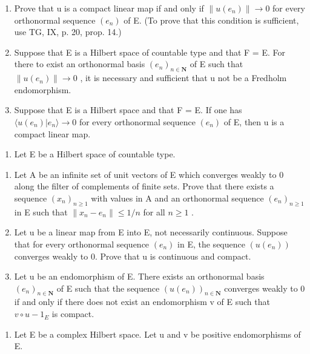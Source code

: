 \begin{enumerate}
\def\labelenumi{\alph{enumi})}
\item
  Prove that u is a compact linear map if and only if \(\|u(e_{n})\|\to0\) for every orthonormal sequence \((e_{n})\) of E. (To prove that this condition is sufficient, use TG, IX, p. 20, prop. 14.)
\item
  Suppose that E is a Hilbert space of countable type and that F = E. For there to exist an orthonormal basis \((e_{n})_{n\in\mathbf{N}}\) of E such that \(\|u(e_{n})\|\to0\) , it is necessary and sufficient that u not be a Fredholm endomorphism.
\item
  Suppose that E is a Hilbert space and that F = E. If one has \(\langle u(e_{n}) | e_{n} \rangle \to 0\) for every orthonormal sequence \((e_{n})\) of E, then u is a compact linear map.
\end{enumerate}

\begin{enumerate}
\def\labelenumi{\arabic{enumi})}
\setcounter{enumi}{20}
\tightlist
\item
  Let E be a Hilbert space of countable type.
\end{enumerate}

\begin{enumerate}
\def\labelenumi{\alph{enumi})}
\item
  Let A be an infinite set of unit vectors of E which converges weakly to 0 along the filter of complements of finite sets. Prove that there exists a sequence \((x_{n})_{n\geqslant1}\) with values in A and an orthonormal sequence \((e_{n})_{n\geqslant1}\) in E such that \(\|x_{n}-e_{n}\|\leqslant1/n\) for all \(n\geqslant1\) .
\item
  Let u be a linear map from E into E, not necessarily continuous. Suppose that for every orthonormal sequence \((e_{n})\) in E, the sequence \((u(e_{n}))\) converges weakly to 0. Prove that u is continuous and compact.
\item
  Let u be an endomorphism of E. There exists an orthonormal basis \((e_{n})_{n\in\mathbf{N}}\) of E such that the sequence \((u(e_{n}))_{n\in\mathbf{N}}\) converges weakly to 0 if and only if there does not exist an endomorphism v of E such that \(v\circ u-1_{E}\) is compact.
\end{enumerate}

\begin{enumerate}
\def\labelenumi{\arabic{enumi})}
\setcounter{enumi}{21}
\tightlist
\item
  Let E be a complex Hilbert space. Let u and v be positive endomorphisms of E.
\end{enumerate}

